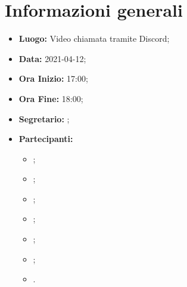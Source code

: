 \section{Informazioni generali}
	\begin{itemize}
		\item \textbf{Luogo:} Video chiamata tramite Discord;
		\item \textbf{Data:} 2021-04-12;
		\item \textbf{Ora Inizio:} 17:00;
		\item \textbf{Ora Fine:} 18:00;
		\item \textbf{Segretario:} \SB ;
		\item \textbf{Partecipanti:}
		\begin{itemize}
			\item \MB ;
			\item \VAS ;
			\item \FD ;
			\item \NM ;
			\item \SB ;
			\item \GB ;
			\item \MDI .
		\end{itemize}
		
	\end{itemize}